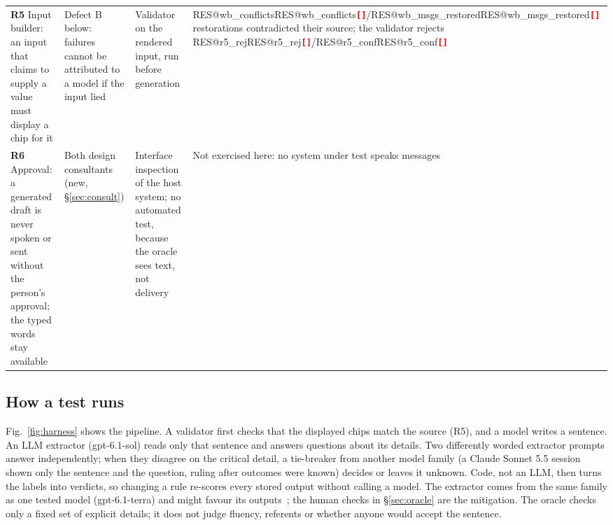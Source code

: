 \documentclass[conference,10pt]{IEEEtran}
\makeatletter
\newcommand{\RES}[1]{\ifcsname RES@#1\endcsname\csname RES@#1\endcsname\else\RESmissing{#1}\fi}
\newcommand{\RESmissing}[1]{\textcolor{red}{\textbf{\texttt{[\detokenize{#1}]}}}}
\makeatother
\begin{document}
\begin{table}[t]
\begin{tabularx}{\textwidth}{@{}>{\raggedright\arraybackslash}p{3.45cm}>{\raggedright\arraybackslash}p{2.9cm}>{\raggedright\arraybackslash}p{3.5cm}>{\raggedright\arraybackslash}X@{}}
    \addlinespace
    \textbf{R5} Input builder: an input that claims to supply a value must display a chip for it &
    Defect B below: failures cannot be attributed to a model if the input lied &
    Validator on the rendered input, run before generation &
    \RES{wb_conflicts}/\RES{wb_msgs_restored} restorations contradicted their source; the validator rejects \RES{r5_rej}/\RES{r5_conf}\\
    \addlinespace
    \textbf{R6} Approval: a generated draft is never spoken or sent without the person's approval; the typed words stay available &
    Both design consultants (new, \S\ref{sec:consult}) &
    Interface inspection of the host system; no automated test, because the oracle sees text, not delivery &
    Not exercised here: no system under test speaks messages\\
    \bottomrule
  \end{tabularx}
  \par{}
\end{table}

\subsection{How a test runs}
Fig.~\ref{fig:harness} shows the pipeline.
A validator first checks that the displayed chips match the source (R5), and a model writes a sentence.
An LLM extractor (gpt-6.1-sol) reads only that sentence and answers questions about its details.
Two differently worded extractor prompts answer independently; when they disagree on the critical detail, a tie-breaker from another model family (a Claude Sonnet 5.5 session shown only the sentence and the question, ruling after outcomes were known) decides or leaves it unknown.
Code, not an LLM, then turns the labels into verdicts, so changing a rule re-scores every stored output without calling a model.
The extractor comes from the same family as one tested model (gpt-6.1-terra) and might favour its outputs~\cite{zheng2023judging}; the human checks in \S\ref{sec:oracle} are the mitigation.
The oracle checks only a fixed set of explicit details; it does not judge fluency, referents or whether anyone would accept the sentence.
\end{document}
